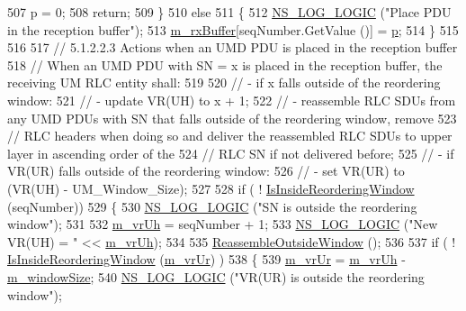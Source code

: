 \begin{DoxyCode}
507       p = 0;
508       \textcolor{keywordflow}{return};
509     \}
510   \textcolor{keywordflow}{else}
511     \{
512       \hyperlink{group__logging_ga88acd260151caf2db9c0fc84997f45ce}{NS\_LOG\_LOGIC} (\textcolor{stringliteral}{"Place PDU in the reception buffer"});
513       \hyperlink{classns3_1_1LteRlcUm_aa4611282929afb798d591eafca1e6adb}{m\_rxBuffer}[seqNumber.GetValue ()] = \hyperlink{lte__link__budget_8m_ac9de518908a968428863f829398a4e62}{p};
514     \}
515 
516 
517   \textcolor{comment}{// 5.1.2.2.3 Actions when an UMD PDU is placed in the reception buffer}
518   \textcolor{comment}{// When an UMD PDU with SN = x is placed in the reception buffer, the receiving UM RLC entity shall:}
519 
520   \textcolor{comment}{// - if x falls outside of the reordering window:}
521   \textcolor{comment}{//    - update VR(UH) to x + 1;}
522   \textcolor{comment}{//    - reassemble RLC SDUs from any UMD PDUs with SN that falls outside of the reordering window, remove}
523   \textcolor{comment}{//      RLC headers when doing so and deliver the reassembled RLC SDUs to upper layer in ascending order
       of the}
524   \textcolor{comment}{//      RLC SN if not delivered before;}
525   \textcolor{comment}{//    - if VR(UR) falls outside of the reordering window:}
526   \textcolor{comment}{//        - set VR(UR) to (VR(UH) - UM\_Window\_Size);}
527 
528   \textcolor{keywordflow}{if} ( ! \hyperlink{classns3_1_1LteRlcUm_af9dc02493802d28c36558a1f1324cd4c}{IsInsideReorderingWindow} (seqNumber))
529     \{
530       \hyperlink{group__logging_ga88acd260151caf2db9c0fc84997f45ce}{NS\_LOG\_LOGIC} (\textcolor{stringliteral}{"SN is outside the reordering window"});
531 
532       \hyperlink{classns3_1_1LteRlcUm_aac5ed94d69ff8dbcd7bda1cbe0d3f2f4}{m\_vrUh} = seqNumber + 1;
533       \hyperlink{group__logging_ga88acd260151caf2db9c0fc84997f45ce}{NS\_LOG\_LOGIC} (\textcolor{stringliteral}{"New VR(UH) = "} << \hyperlink{classns3_1_1LteRlcUm_aac5ed94d69ff8dbcd7bda1cbe0d3f2f4}{m\_vrUh});
534 
535       \hyperlink{classns3_1_1LteRlcUm_a49f67e2001fc4609ef592ccda50606ab}{ReassembleOutsideWindow} ();
536 
537       \textcolor{keywordflow}{if} ( ! \hyperlink{classns3_1_1LteRlcUm_af9dc02493802d28c36558a1f1324cd4c}{IsInsideReorderingWindow} (\hyperlink{classns3_1_1LteRlcUm_a04515ea87c413d29a9be9b0a085f5d64}{m\_vrUr}) )
538         \{
539           \hyperlink{classns3_1_1LteRlcUm_a04515ea87c413d29a9be9b0a085f5d64}{m\_vrUr} = \hyperlink{classns3_1_1LteRlcUm_aac5ed94d69ff8dbcd7bda1cbe0d3f2f4}{m\_vrUh} - \hyperlink{classns3_1_1LteRlcUm_aa26c2e759abe7309fa1daf32ab7bfa0a}{m\_windowSize};
540           \hyperlink{group__logging_ga88acd260151caf2db9c0fc84997f45ce}{NS\_LOG\_LOGIC} (\textcolor{stringliteral}{"VR(UR) is outside the reordering window"});

\end{DoxyCode}
